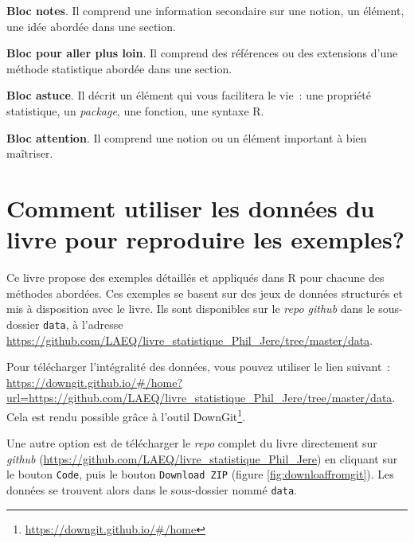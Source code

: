 \documentclass[
  11pt,
  french,
]{book}
\makeatletter
\renewcommand{\href}[2]{#2\footnote{\url{#1}}}
\newenvironment{kframev}{%
\medskip{}
\setlength{\fboxsep}{.8em}
 \def\at@end@of@kframev{}%
 \ifinner\ifhmode%
  \def\at@end@of@kframev{\end{minipage}}%
  \begin{minipage}{\columnwidth}%
 \fi\fi%
 \def\FrameCommand##1{\hskip\@totalleftmargin \hskip-\fboxsep
 \colorbox{shadebluecolor}{##1}\hskip-\fboxsep
     \hskip-\linewidth \hskip-\@totalleftmargin \hskip\columnwidth}%
 \MakeFramed {\advance\hsize-\width
   \@totalleftmargin\z@ \linewidth\hsize
   \@setminipage}}%
 {\par\unskip\endMakeFramed%
 \at@end@of@kframev}
\newenvironment{rmdblock}[1]
  {
  \begin{itemize}
  \renewcommand{\labelitemi}{
    \raisebox{-.7\height}[0pt][0pt]{
      {\setkeys{Gin}{width=3em,keepaspectratio}\texttt{[image: images/\#1]}}
    }
  }
  \setlength{\fboxsep}{1em}
  \begin{kframev}
  \small
  \item
  }
  {
  \end{kframev}
  \end{itemize}
  }
\newenvironment{bloc_notes}
  {\begin{rmdblock}{notes}}
  {\end{rmdblock}}
\newenvironment{bloc_aller_loin}
  {\begin{rmdblock}{aller_loin}}
  {\end{rmdblock}}
\newenvironment{bloc_astuce}
  {\begin{rmdblock}{astuce}}
  {\end{rmdblock}}
\newenvironment{bloc_attention}
  {\begin{rmdblock}{attention}}
  {\end{rmdblock}}
\makeatother
\begin{document}
\begin{bloc_notes}
\textbf{Bloc notes}. Il comprend une information secondaire sur une notion, un élément, une idée abordée dans une section.

\end{bloc_notes}

\begin{bloc_aller_loin}
\textbf{Bloc pour aller plus loin}. Il comprend des références ou des extensions d'une méthode statistique abordée dans une section.

\end{bloc_aller_loin}

\begin{bloc_astuce}
\textbf{Bloc astuce}. Il décrit un élément qui vous facilitera le vie~: une propriété statistique, un \emph{package}, une fonction, une syntaxe R.

\end{bloc_astuce}

\begin{bloc_attention}
\textbf{Bloc attention}. Il comprend une notion ou un élément important à bien maîtriser.

\end{bloc_attention}

\hypertarget{sect003B}{%
\section*{Comment utiliser les données du livre pour reproduire les exemples?}\label{sect003B}}

Ce livre propose des exemples détaillés et appliqués dans R pour chacune des méthodes abordées. Ces exemples se basent sur des jeux de données structurés et mis à disposition avec le livre. Ils sont disponibles sur le \emph{repo github} dans le sous-dossier \texttt{data}, à l'adresse \url{https://github.com/LAEQ/livre_statistique_Phil_Jere/tree/master/data}.

Pour télécharger l'intégralité des données, vous pouvez utiliser le lien suivant~: \url{https://downgit.github.io/\#/home?url=https://github.com/LAEQ/livre_statistique_Phil_Jere/tree/master/data}. Cela est rendu possible grâce à l'outil \href{https://downgit.github.io/\#/home}{DownGit}.

Une autre option est de télécharger le \emph{repo} complet du livre directement sur \emph{github} (\url{https://github.com/LAEQ/livre_statistique_Phil_Jere}) en cliquant sur le bouton \texttt{Code}, puis le bouton \texttt{Download\ ZIP} (figure \ref{fig:downloaffromgit}). Les données se trouvent alors dans le sous-dossier nommé \texttt{data}.
\end{document}
